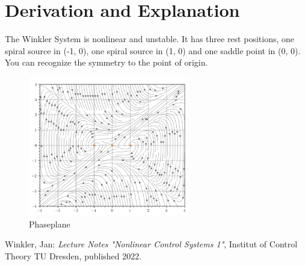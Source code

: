 \documentclass[10pt,a4paper]{article}
\begin{document}
	\section{Derivation and Explanation} %
	The Winkler System is nonlinear and unstable. It has three rest positions, one spiral source in (-1, 0), one spiral source in (1, 0) and one saddle point in (0, 0). You can recognize the symmetry to the point of origin. 
	\begin{figure}[H]
		\centering
		\includegraphics[width=70mm]{winkler_pp.pdf}
		\caption{Phaseplane}
	\end{figure}
	
	
	\begin{thebibliography}{10}		
		Winkler, Jan:
		\textit{Lecture Notes "Nonlinear Control Systems 1"}, Institut of Control Theory TU Dresden, published 2022.
	\end{thebibliography}
\end{document}

